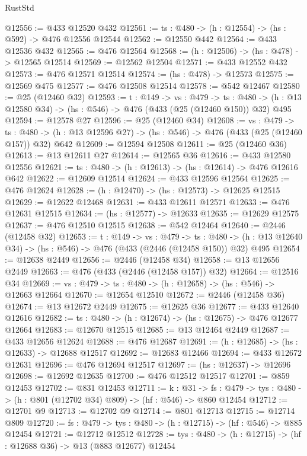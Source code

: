 \begin{lexlean}{RustStd}
\begin{coremodule}
@12556 := @433 @12520 @432
@12561 := {ts : @480} -> (h : @12554) -> (hs : @592) -> @476 @12556 @12544
@12562 := @12550 @442
@12564 := @433 @12536 @432
@12565 := @476 @12564
@12568 := (h : @12506) -> (hs : @478) -> @12565 @12514
@12569 := @12562 @12504
@12571 := @433 @12552 @432
@12573 := @476 @12571 @12514
@12574 := (hs : @478) -> @12573
@12575 := @12569 @475
@12577 := @476 @12508 @12514
@12578 := @542 @12467
@12580 := @25 (@12460 @32)
@12593 := {t : @149} ->
  {vs : @479} ->
  {ts : @480} -> (h : @13 @12580 @34) -> (hs : @546) -> @476 (@433 (@25 (@12460 @150)) @32) @495
@12594 := @12578 @27
@12596 := @25 (@12460 @34)
@12608 := {vs : @479} ->
  {ts : @480} -> (h : @13 @12596 @27) -> (hs : @546) -> @476 (@433 (@25 (@12460 @157)) @32) @642
@12609 := @12594 @12508
@12611 := @25 (@12460 @36)
@12613 := @13 @12611 @27
@12614 := @12565 @36
@12616 := @433 @12580 @12556
@12621 := {ts : @480} -> (h : @12613) -> (hs : @12614) -> @476 @12616 @642
@12622 := @12609 @12514
@12624 := @433 @12596 @12564
@12625 := @476 @12624
@12628 := (h : @12470) -> (hs : @12573) -> @12625 @12515
@12629 := @12622 @12468
@12631 := @433 @12611 @12571
@12633 := @476 @12631 @12515
@12634 := (hs : @12577) -> @12633
@12635 := @12629 @12575
@12637 := @476 @12510 @12515
@12638 := @542 @12464
@12640 := @2446 (@12458 @32)
@12653 := {t : @149} ->
  {vs : @479} ->
  {ts : @480} -> (h : @13 @12640 @34) -> (hs : @546) -> @476 (@433 (@2446 (@12458 @150)) @32) @495
@12654 := @12638 @2449
@12656 := @2446 (@12458 @34)
@12658 := @13 @12656 @2449
@12663 := @476 (@433 (@2446 (@12458 @157)) @32)
@12664 := @12516 @34
@12669 := {vs : @479} -> {ts : @480} -> (h : @12658) -> (hs : @546) -> @12663 @12664
@12670 := @12654 @12510
@12672 := @2446 (@12458 @36)
@12674 := @13 @12672 @2449
@12675 := @12625 @36
@12677 := @433 @12640 @12616
@12682 := {ts : @480} -> (h : @12674) -> (hs : @12675) -> @476 @12677 @12664
@12683 := @12670 @12515
@12685 := @13 @12464 @2449
@12687 := @433 @12656 @12624
@12688 := @476 @12687
@12691 := (h : @12685) -> (hs : @12633) -> @12688 @12517
@12692 := @12683 @12466
@12694 := @433 @12672 @12631
@12696 := @476 @12694 @12517
@12697 := (hs : @12637) -> @12696
@12698 := @12692 @12635
@12700 := @476 @12512 @12517
@12701 := @859 @12453
@12702 := @831 @12453
@12711 := {k : @31} ->
  {fs : @479} -> {tys : @480} -> (h : @801 (@12702 @34) @809) -> (hf : @546) -> @860 @12454
@12712 := @12701 @9
@12713 := @12702 @9
@12714 := @801 @12713
@12715 := @12714 @809
@12720 := {fs : @479} -> {tys : @480} -> (h : @12715) -> (hf : @546) -> @885 @12454
@12721 := @12712 @12512
@12728 := {tys : @480} -> (h : @12715) -> (hf : @12688 @36) -> @13 (@883 @12677) @12454

\end{coremodule}
\end{lexlean}
